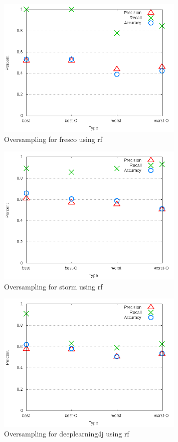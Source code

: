 \begin{figure}[!ht]
    \centering
        \includegraphics[width=0.8\textwidth]{images/rf/test_4/fresco_sample_range}
        \caption{Oversampling for fresco using \gls{rf}}
        \label{fig:test_4_fresco_rf}
\end{figure}

\begin{figure}[!ht]
    \centering
        \includegraphics[width=0.8\textwidth]{images/rf/test_4/storm_sample_range}
        \caption{Oversampling for storm using \gls{rf}}
        \label{fig:test_4_storm_rf}
\end{figure}

\begin{figure}[!ht]
    \centering
        \includegraphics[width=0.8\textwidth]{images/rf/test_4/deeplearning4j_sample_range}
    \caption{Oversampling for deeplearning4j using \gls{rf}}
    \label{fig:test_4_deeplearning4j_rf}
\end{figure}

